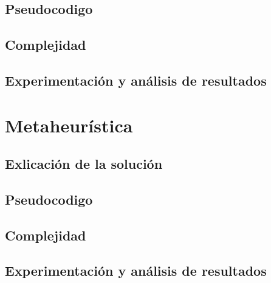 \documentclass[spanish,12pt]{article}
\begin{document}
\subsection{Pseudocodigo}

\subsection{Complejidad}

\subsection{Experimentación y análisis de resultados}



\section{Metaheurística}

\subsection{Exlicación de la solución}

\subsection{Pseudocodigo}

\subsection{Complejidad}

\subsection{Experimentación y análisis de resultados}
\end{document}
